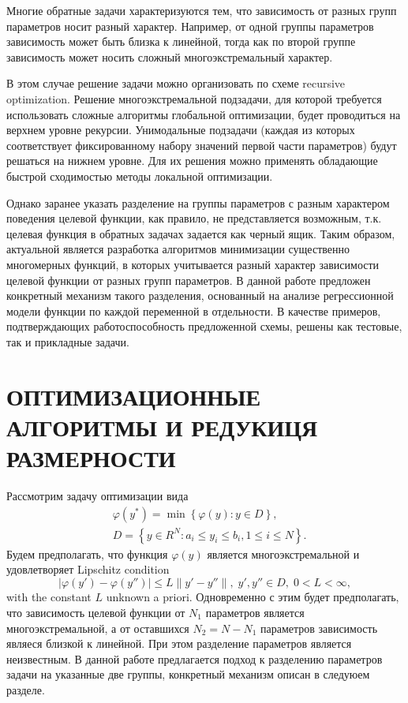 \documentclass{aip-cp}
\begin{document}
Многие обратные задачи характеризуются тем, что зависимость от разных групп параметров носит разный характер. Например, от одной группы параметров зависимость может быть близка к линейной, тогда как по второй группе зависимость может носить сложный многоэкстремальный характер.

В этом случае решение задачи можно организовать по схеме recursive optimization. Решение  многоэкстремальной подзадачи, для которой требуется использовать сложные алгоритмы глобальной оптимизации, будет проводиться на верхнем уровне рекурсии.
Унимодальные подзадачи (каждая из которых соответствует фиксированному набору значений первой части параметров) будут решаться на нижнем уровне. Для их решения можно применять обладающие быстрой сходимостью методы локальной оптимизации.

Однако заранее указать разделение на группы параметров с разным характером поведения целевой функции, как правило, не представляется возможным, т.к. целевая функция в обратных задачах задается как черный ящик. 
Таким образом, актуальной является разработка алгоритмов минимизации существенно многомерных функций, в которых учитывается разный характер зависимости целевой функции от разных групп параметров. 
В данной работе предложен конкретный механизм такого разделения, основанный на анализе регрессионной модели функции по каждой переменной в отдельности.
В качестве примеров, подтверждающих работоспособность предложенной схемы, решены как тестовые, так и прикладные задачи.

\section{ОПТИМИЗАЦИОННЫЕ АЛГОРИТМЫ И РЕДУКИЦЯ РАЗМЕРНОСТИ}

Рассмотрим задачу оптимизации вида
\begin{eqnarray}\label{main_problem}
& \varphi(y^\ast)=\min{\left\{\varphi(y): y\in D\right\}}, \nonumber \\
& D=\left\{y\in R^N: a_i\leq y_i \leq b_i, 1\leq i \leq N\right\}. \nonumber
\end{eqnarray}
Будем предполагать, что функция $\varphi(y)$ является многоэкстремальной и удовлетворяет Lipschitz condition
\[
\left|\varphi(y')-\varphi(y'')\right|\leq L\left\|y'-y''\right\|,\; y',y'' \in D,\; 0<L<\infty,
\]
with the constant $L$ unknown a priori.
Одновременно с этим будет предполагать, что зависимость целевой функции от $N_1$ параметров является многоэкстремальной, а от оставшихся $N_2 = N - N_1$ параметров зависимость являеся близкой к линейной. При этом разделение  параметров является неизвестным. В данной работе предлагается подход к разделению параметров задачи на указанные две группы, конкретный механизм описан в следуюем разделе. 
\end{document}
